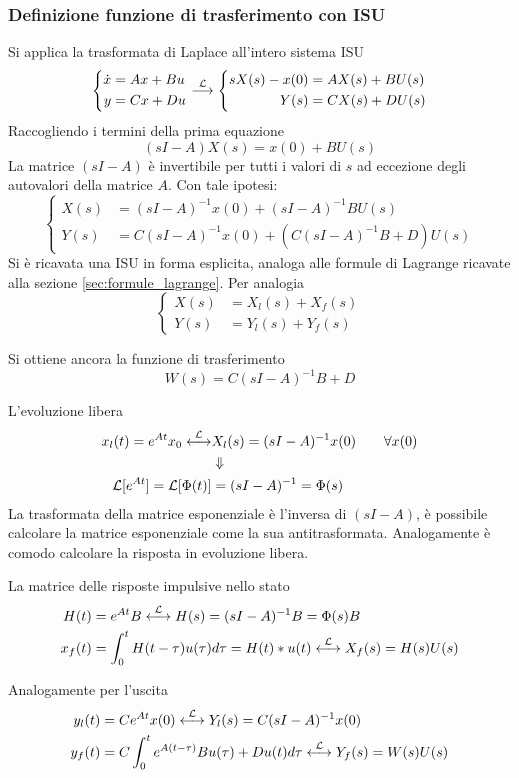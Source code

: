 \subsubsection{Definizione funzione di trasferimento con ISU}
Si applica la trasformata di Laplace all'intero sistema ISU
$$
\left\{\begin{aligned}
\dot{x} &= Ax+Bu \\
y &= Cx +Du
\end{aligned}\right. \stackrel{\mathcal{L}}{\longrightarrow} \left\{\begin{aligned}
sX(s) - x(0) &= AX(s) + BU(s) \\
Y(s) &= CX(s) + DU(s)
\end{aligned}\right.
$$
Raccogliendo i termini della prima equazione
$$
\left(sI-A\right)X(s) = x(0) + BU(s)
$$
La matrice $(sI-A)$ è invertibile per tutti i valori di $s$ ad eccezione degli
autovalori della matrice $A$.
Con tale ipotesi:
$$\left\{\begin{aligned}
X(s) &= (sI-A)^{-1}x(0) + (sI-A)^{-1}BU(s)\\
Y(s) &= C(sI-A)^{-1}x(0) + \left(C(sI-A)^{-1}B+D\right)U(s)\end{aligned}\right.
$$
Si è ricavata una ISU in forma esplicita, analoga alle formule di Lagrange
ricavate alla sezione \ref{sec:formule_lagrange}.
Per analogia
$$
\left\{\begin{aligned}
X(s) &= X_l(s) + X_f(s)\\
Y(s) &= Y_l(s) + Y_f(s)
\end{aligned}\right.
$$

Si ottiene ancora la funzione di trasferimento
$$
W(s) = C(sI-A)^{-1}B + D
$$

L'evoluzione libera
$$\begin{aligned}
x_l(t) = e^{At}x_0 \stackrel{\mathcal{L}}{\longleftrightarrow}& X_l(s) =
(sI-A)^{-1}x(0) \qquad \forall x(0)\\
&\Downarrow\\
\mathcal{L}[e^{At}] = \mathcal{L}[\Phi(t)] &= (sI-A)^{-1}=\Phi(s)
\end{aligned}
$$
La trasformata della matrice esponenziale è l'inversa di $(sI-A)$, è possibile
calcolare la matrice esponenziale come la sua antitrasformata. Analogamente è
comodo calcolare la risposta in evoluzione libera.

La matrice delle risposte impulsive nello stato
$$\begin{aligned}
H(t) &= e^{At} B \stackrel{\mathcal{L}}{\longleftrightarrow} H(s) = (sI-A)^{-1}B
=\Phi(s)B\\
x_f(t) &= \int_0^t H(t-\tau)u(\tau)d\tau = H(t)*u(t)
\stackrel{\mathcal{L}}{\longleftrightarrow} X_f(s) =H(s)U(s)
\end{aligned}
$$

Analogamente per l'uscita
$$\begin{aligned}
y_l(t) &= Ce^{At}x(0) \stackrel{\mathcal{L}}{\longleftrightarrow} Y_l(s) =
C(sI-A)^{-1}x(0)\\
y_f(t) &= C\int_0^te^{A(t-\tau)}Bu(\tau) + Du(t) d\tau
\stackrel{\mathcal{L}}{\longleftrightarrow} Y_f(s) = W(s)U(s)
\end{aligned}$$
